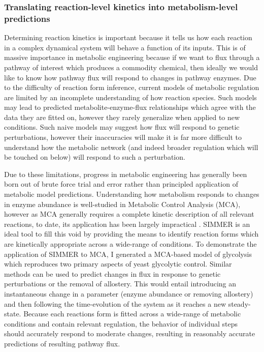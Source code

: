 \subsubsection{Translating reaction-level kinetics into metabolism-level predictions}

Determining reaction kinetics is important because it tells us how each reaction in a complex dynamical system will behave a function of its inputs. This is of massive importance in metabolic engineering because if we want to flux through a pathway of interest which produces a commodity chemical, then ideally we would like to know how pathway flux will respond to changes in pathway enzymes. Due to the difficulty of reaction form inference, current models of metabolic regulation are limited by an incomplete understanding of how reaction species. Such models may lead to predicted metabolite-enzyme-flux relationships which agree with the data they are fitted on, however they rarely generalize when applied to new conditions. Such naive models may suggest how flux will respond to genetic perturbations, however their inaccuracies will make it is far more difficult to understand how the metabolic network (and indeed broader regulation which will be touched on below) will respond to such a perturbation. 

Due to these limitations, progress in metabolic engineering has generally been born out of brute force trial and error rather than principled application of metabolic model predictions. Understanding how metabolism responds to changes in enzyme abundance is well-studied in Metabolic Control Analysis (MCA), however as MCA generally requires a complete kinetic description of all relevant reactions, to date, its application has been largely impractical \cite{Kacser:1973fe, Fell:1997wg}. SIMMER is an ideal tool to fill this void by providing the means to identify reaction forms which are kinetically appropriate across a wide-range of conditions. To demonstrate the application of SIMMER to MCA, I generated a MCA-based model of glycolysis which reproduces two primary aspects of yeast glycolytic control. Similar methods can be used to predict changes in flux in response to genetic perturbations or the removal of allostery. This would entail introducing an instantaneous change in a parameter (enzyme abundance or removing allostery) and then following the time-evolution of the system as it reaches a new steady-state. Because each reactions form is fitted across a wide-range of metabolic conditions and contain relevant regulation, the behavior of individual steps should accurately respond to moderate changes, resulting in reasonably accurate predictions of resulting pathway flux.


